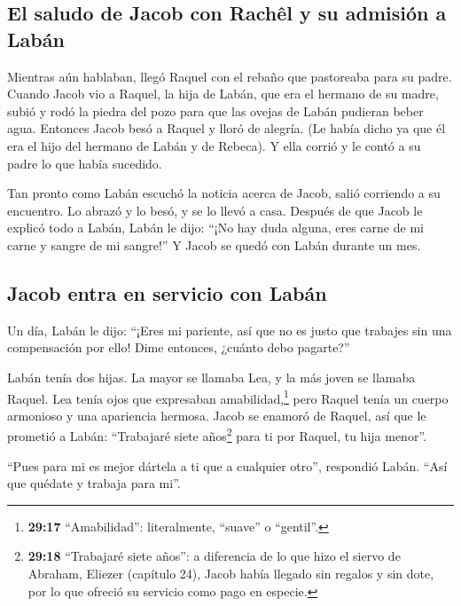 \hypertarget{el-saludo-de-jacob-con-rachuxeal-y-su-admisiuxf3n-a-labuxe1n}{%
\subsection{El saludo de Jacob con Rachêl y su admisión a
Labán}\label{el-saludo-de-jacob-con-rachuxeal-y-su-admisiuxf3n-a-labuxe1n}}

 Mientras aún hablaban, llegó Raquel con el rebaño que
pastoreaba para su padre.  Cuando Jacob vio a Raquel, la
hija de Labán, que era el hermano de su madre, subió y rodó la piedra
del pozo para que las ovejas de Labán pudieran beber agua.
 Entonces Jacob besó a Raquel y lloró de alegría.
 (Le había dicho ya que él era el hijo del hermano de
Labán y de Rebeca). Y ella corrió y le contó a su padre lo que había
sucedido.

 Tan pronto como Labán escuchó la noticia acerca de
Jacob, salió corriendo a su encuentro. Lo abrazó y lo besó, y se lo
llevó a casa. Después de que Jacob le explicó todo a Labán,
 Labán le dijo: ``¡No hay duda alguna, eres carne de mi
carne y sangre de mi sangre!'' Y Jacob se quedó con Labán durante un
mes.

\hypertarget{jacob-entra-en-servicio-con-labuxe1n}{%
\subsection{Jacob entra en servicio con
Labán}\label{jacob-entra-en-servicio-con-labuxe1n}}

 Un día, Labán le dijo: ``¡Eres mi pariente, así que no
es justo que trabajes sin una compensación por ello! Dime entonces,
¿cuánto debo pagarte?''

 Labán tenía dos hijas. La mayor se llamaba Lea, y la más
joven se llamaba Raquel.  Lea tenía ojos que expresaban
amabilidad,\footnote{\textbf{29:17} ``Amabilidad'': literalmente,
  ``suave'' o ``gentil''.} pero Raquel tenía un cuerpo armonioso y una
apariencia hermosa.  Jacob se enamoró de Raquel, así que
le prometió a Labán: ``Trabajaré siete años\footnote{\textbf{29:18}
  ``Trabajaré siete años'': a diferencia de lo que hizo el siervo de
  Abraham, Eliezer (capítulo 24), Jacob había llegado sin regalos y sin
  dote, por lo que ofreció su servicio como pago en especie.} para ti
por Raquel, tu hija menor''.

 ``Pues para mi es mejor dártela a ti que a cualquier
otro'', respondió Labán. ``Así que quédate y trabaja para mi''.

